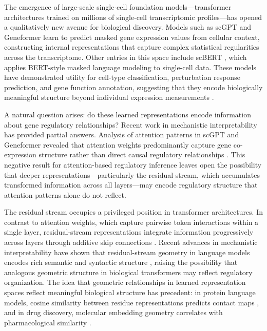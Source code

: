 \documentclass[11pt]{article}
\begin{document}
The emergence of large-scale single-cell foundation models---transformer architectures trained on millions of single-cell transcriptomic profiles---has opened a qualitatively new avenue for biological discovery.
Models such as scGPT \cite{cui2024scgpt} and Geneformer \cite{theodoris2023transfer} learn to predict masked gene expression values from cellular context, constructing internal representations that capture complex statistical regularities across the transcriptome.
Other entries in this space include scBERT \cite{yang2022scbert}, which applies BERT-style masked language modeling to single-cell data.
These models have demonstrated utility for cell-type classification, perturbation response prediction, and gene function annotation, suggesting that they encode biologically meaningful structure beyond individual expression measurements \cite{cui2024scgpt,theodoris2023transfer}.

A natural question arises: do these learned representations encode information about gene regulatory relationships?
Recent work in mechanistic interpretability has provided partial answers.
Analysis of attention patterns in scGPT and Geneformer revealed that attention weights predominantly capture gene co-expression structure rather than direct causal regulatory relationships \cite{kendiukhov2025attention}.
This negative result for attention-based regulatory inference leaves open the possibility that deeper representations---particularly the residual stream, which accumulates transformed information across all layers---may encode regulatory structure that attention patterns alone do not reflect.

The residual stream occupies a privileged position in transformer architectures.
In contrast to attention weights, which capture pairwise token interactions within a single layer, residual-stream representations integrate information progressively across layers through additive skip connections \cite{vaswani2017attention,elhage2021mathematical}.
Recent advances in mechanistic interpretability have shown that residual-stream geometry in language models encodes rich semantic and syntactic structure \cite{elhage2022toy,park2023linear}, raising the possibility that analogous geometric structure in biological transformers may reflect regulatory organization.
The idea that geometric relationships in learned representation spaces reflect meaningful biological structure has precedent: in protein language models, cosine similarity between residue representations predicts contact maps \cite{rao2021transformer}, and in drug discovery, molecular embedding geometry correlates with pharmacological similarity \cite{stokes2020deep}.
\end{document}
